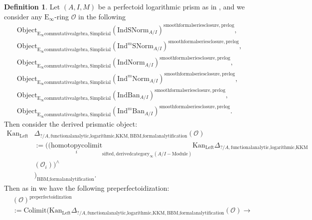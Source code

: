 \documentclass[11pt]{book}
\theoremstyle{definition}
\newtheorem{definition}[theorem]{Definition}
\numberwithin{equation}{section}
\begin{document}
\begin{definition}
Let $(A,I,M)$ be a perfectoid logarithmic prism as in \cite[Definition 3.3]{12Ko1}, and we consider any $\mathrm{E}_\infty$-ring $\mathcal{O}$ in the following
\begin{align}
\mathrm{Object}_{\mathrm{E}_\infty\mathrm{commutativealgebra},\mathrm{Simplicial}}(\mathrm{IndSNorm}_{A/I})^{\mathrm{smoothformalseriesclosure},\text{prelog}},\\
\mathrm{Object}_{\mathrm{E}_\infty\mathrm{commutativealgebra},\mathrm{Simplicial}}(\mathrm{Ind}^m\mathrm{SNorm}_{A/I})^{\mathrm{smoothformalseriesclosure},\text{prelog}},\\
\mathrm{Object}_{\mathrm{E}_\infty\mathrm{commutativealgebra},\mathrm{Simplicial}}(\mathrm{IndNorm}_{A/I})^{\mathrm{smoothformalseriesclosure},\text{prelog}},\\
\mathrm{Object}_{\mathrm{E}_\infty\mathrm{commutativealgebra},\mathrm{Simplicial}}(\mathrm{Ind}^m\mathrm{Norm}_{A/I})^{\mathrm{smoothformalseriesclosure},\text{prelog}},\\
\mathrm{Object}_{\mathrm{E}_\infty\mathrm{commutativealgebra},\mathrm{Simplicial}}(\mathrm{IndBan}_{A/I})^{\mathrm{smoothformalseriesclosure},\text{prelog}},\\
\mathrm{Object}_{\mathrm{E}_\infty\mathrm{commutativealgebra},\mathrm{Simplicial}}(\mathrm{Ind}^m\mathrm{Ban}_{A/I})^{\mathrm{smoothformalseriesclosure},\text{prelog}}.
\end{align}
Then consider the derived prismatic object:
\begin{align}
\mathrm{Kan}_{\mathrm{Left}}&\Delta_{?/A,\text{functionalanalytic,logarithmic,KKM},\text{BBM,formalanalytification}}(\mathcal{O})\\
&:=	((\underset{i}{\text{homotopycolimit}}_{\text{sifted},\text{derivedcategory}_{\infty}(A/I-\text{Module})}\mathrm{Kan}_{\mathrm{Left}}\Delta_{?/A,\text{functionalanalytic,logarithmic,KKM}}\\
&(\mathcal{O}_i))^\wedge\\
&)_\text{BBM,formalanalytification}.
\end{align}
Then as in \cite[Definition 8.2]{12BS} we have the following preperfectoidization:
\begin{align}
&(\mathcal{O})^{\text{preperfectoidization}}\\
&:=\mathrm{Colimit}(\mathrm{Kan}_{\mathrm{Left}}\Delta_{?/A,\text{functionalanalytic,logarithmic,KKM},\text{BBM,formalanalytification}}(\mathcal{O})\longrightarrow \\

\end{align}
\end{definition}
\end{document}
